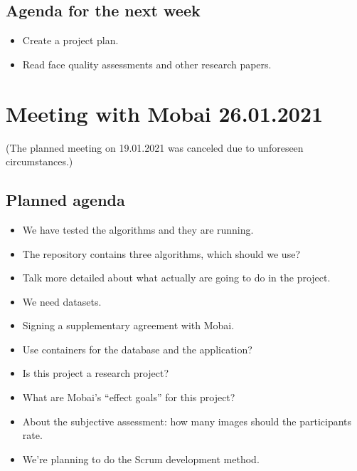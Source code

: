 \subsection*{Agenda for the next week}
\begin{itemize}
    \item Create a project plan.
    \item Read face quality assessments and other research papers.
\end{itemize}


\newpage

\section*{Meeting with Mobai 26.01.2021}
(The planned meeting on 19.01.2021 was canceled due to unforeseen circumstances.) 

\subsection*{Planned agenda}
\begin{itemize}
    \item We have tested the algorithms and they are running.
    \item The repository contains three algorithms, which should we use?
    \item Talk more detailed about what actually are going to do in the project.
    \item We need datasets.
    \item Signing a supplementary agreement with Mobai.
    \item Use containers for the database and the application?
    \item Is this project a research project?
    \item What are Mobai’s “effect goals” for this project?
    \item About the subjective assessment: how many images should the participants rate.
    \item We’re planning to do the Scrum development method.
\end{itemize}

